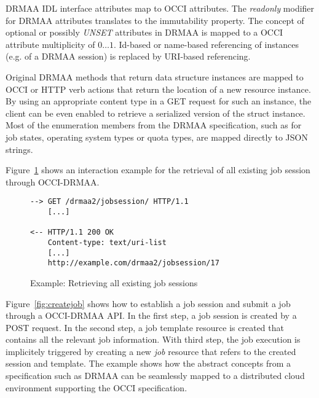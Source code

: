 \documentclass[twocolumn]{svjour3}       %
\begin{document}
DRMAA IDL interface attributes map to OCCI attributes. The \emph{readonly} modifier for DRMAA attributes translates to the immutability property. The concept of optional or possibly \emph{UNSET} attributes in DRMAA is mapped to a OCCI attribute multiplicity of $0\ldots1$. Id-based or name-based referencing of instances (e.g. of a DRMAA session) is replaced by URI-based referencing.

Original DRMAA methods that return data structure instances are mapped to OCCI or HTTP verb actions that return the location of a new resource instance. By using an appropriate content type in a GET request for such an instance, the client can be even enabled to retrieve a serialized version of the struct instance. Most of the enumeration members from the DRMAA specification, such as for job states, operating system types or quota types, are mapped directly to JSON strings. 

Figure~\ref{fig:getsessions} shows an interaction example for the retrieval of all existing job session through OCCI-DRMAA.

\begin{figure}
\begin{lstlisting}
--> GET /drmaa2/jobsession/ HTTP/1.1
    [...]

<-- HTTP/1.1 200 OK 
    Content-type: text/uri-list
    [...]
    http://example.com/drmaa2/jobsession/17
\end{lstlisting}
\caption{Example: Retrieving all existing job sessions}
\label{fig:getsessions} 
\end{figure}

Figure~\ref{fig:createjob} shows how to establish a job session and submit a job through a OCCI-DRMAA API. In the first step, a job session is created by a POST request. In the second step, a job template resource is created that contains all the relevant job information. With third step, the job execution is implicitely triggered by creating a new \emph{job} resource that refers to the created session and template. The example shows how the abstract concepts from a specification such as DRMAA can be seamlessly mapped to a distributed cloud environment supporting the OCCI specification.
\end{document}
